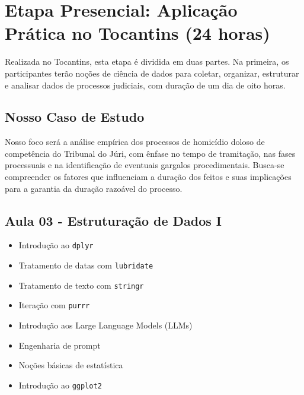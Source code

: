 \documentclass[
  letterpaper,
  DIV=11,
  numbers=noendperiod]{scrreprt}
\providecommand{\tightlist}{%
  \setlength{\itemsep}{0pt}\setlength{\parskip}{0pt}}
\begin{document}
\section{Etapa Presencial: Aplicação Prática no Tocantins (24
horas)}\label{etapa-presencial-aplicauxe7uxe3o-pruxe1tica-no-tocantins-24-horas}

Realizada no Tocantins, esta etapa é dividida em duas partes. Na
primeira, os participantes terão noções de ciência de dados para
coletar, organizar, estruturar e analisar dados de processos judiciais,
com duração de um dia de oito horas.

\subsection{Nosso Caso de Estudo}\label{nosso-caso-de-estudo}

Nosso foco será a análise empírica dos processos de homicídio doloso de
competência do Tribunal do Júri, com ênfase no tempo de tramitação, nas
fases processuais e na identificação de eventuais gargalos
procedimentais. Busca-se compreender os fatores que influenciam a
duração dos feitos e suas implicações para a garantia da duração
razoável do processo.

\subsection{Aula 03 - Estruturação de Dados
I}\label{aula-03---estruturauxe7uxe3o-de-dados-i}

\begin{itemize}
\tightlist
\item
  Introdução ao \texttt{dplyr}\\
\item
  Tratamento de datas com \texttt{lubridate}\\
\item
  Tratamento de texto com \texttt{stringr}\\
\item
  Iteração com \texttt{purrr}\\
\item
  Introdução aos Large Language Models (LLMs)\\
\item
  Engenharia de prompt
\item
  Noções básicas de estatística\\
\item
  Introdução ao \texttt{ggplot2}
\end{itemize}
\end{document}
